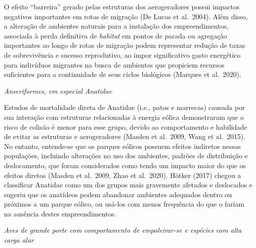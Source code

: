 \documentclass[
  oneside]{scrbook}
\begin{document}
O efeito ``barreira'' gerado pelas estruturas dos aerogeradores possui impactos negativos importantes em rotas de migração (De Lucas et al.~2004). Além disso, a alteração de ambientes naturais para a instalação dos empreendimentos, associada à perda definitiva de \emph{habitat} em pontos de parada ou agregação importantes ao longo de rotas de migração podem representar redução de taxas de sobrevivência e sucesso reprodutivo, ao impor significativo gasto energético para indivíduos migrantes na busca de ambientes que propiciem recursos suficientes para a continuidade de seus ciclos biológicos (Marques et al.~2020).

\emph{Anseriformes, em especial Anatidae}

Estudos de mortalidade direta de Anatidae (i.e., patos e marrecas) causada por sua interação com estruturas relacionadas à energia eólica demonstraram que o risco de colisão é menor para esse grupo, devido ao comportamento e habilidade de evitar as estruturas e aerogeradores (Masden et al.~2009, Wang et al.~2015). No entanto, entende-se que os parques eólicos possuem efeitos indiretos nessas populações, incluindo alterações no uso dos ambientes, padrões de distribuição e deslocamento, que foram considerados como tendo um impacto maior do que os efeitos diretos (Masden et al.~2009, Zhao et al.~2020). Hötker (2017) chegou a classificar Anatidae como um dos grupos mais gravemente afetados e deslocados e sugeriu que os anatídeos podem abandonar ambientes adequados dentro ou próximos a um parque eólico, ou usá-los com menos frequência do que o fariam na ausência destes empreendimentos.

\emph{Aves de grande porte com comportamento de empoleirar-se e espécies com alta carga alar}
\end{document}
